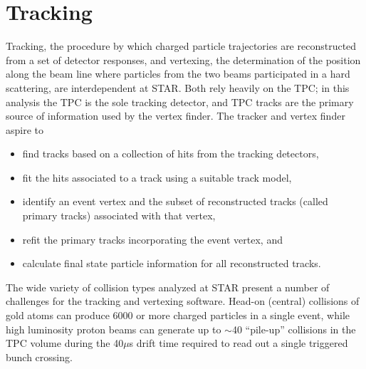 \section{Tracking}

Tracking, the procedure by which charged particle trajectories are
reconstructed from a set of detector responses, and vertexing, the
determination of the position along the beam line where particles from the two
beams participated in a hard scattering, are interdependent at STAR. Both rely
heavily on the TPC; in this analysis the TPC is the sole tracking detector,
and TPC tracks are the primary source of information used by the vertex
finder. The tracker \cite{Rose:2003wx} and vertex finder
\cite{vertex-finder-starnote} aspire to
%
\begin{itemize}
  \item find tracks based on a collection of hits from the tracking detectors,
  \item fit the hits associated to a track using a suitable track model,
  \item identify an event vertex and the subset of reconstructed tracks (called primary tracks) associated with that vertex,
  \item refit the primary tracks incorporating the event vertex, and
  \item calculate final state particle information for all reconstructed tracks.
\end{itemize}
%
The wide variety of collision types analyzed at STAR present a number of
challenges for the tracking and vertexing software. Head-on (central)
collisions of gold atoms can produce 6000 or more charged particles in a
single event, while high luminosity proton beams can generate up to $\sim$40
``pile-up'' collisions in the TPC volume during the 40$\mu$s drift time
required to read out a single triggered bunch crossing.

